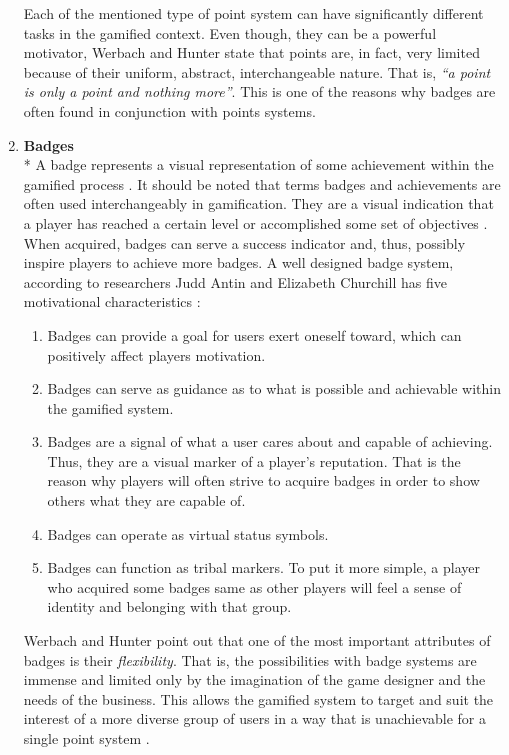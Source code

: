 \begin{enumerate}
\begin{itemize}
\end{itemize}
Each of the mentioned type of point system can have significantly different tasks in the gamified context. Even though, they can be a powerful motivator, Werbach and Hunter state that points are, in fact, very limited because of their uniform, abstract, interchangeable nature. That is, \textit{``a point is only a point and nothing more''}\cite{werbach2012win}. This is one of the reasons why badges are often found in conjunction with points systems.
\item \textbf{Badges}\\*
A badge represents a visual representation of some achievement within the gamified process \cite{WerbachCoursera, werbach2012win}. It should be noted that terms badges and achievements are often used interchangeably in
gamification. They are a visual indication that a player has reached a certain level or accomplished some set of objectives \cite{werbach2012win, zichermann2011gamification}. When acquired, badges can serve a success indicator and, thus, possibly inspire players to achieve more badges. A well designed badge system, according to researchers Judd Antin and Elizabeth Churchill has five motivational characteristics \cite{werbach2012win}:
\begin{enumerate}
\item Badges can provide a goal for users exert oneself toward, which can positively affect players motivation.
\item Badges can serve as guidance as to what is possible and achievable within the gamified system. 
\item Badges are a signal of what a user cares about and capable of achieving. Thus, they are a visual marker of a player's reputation. That is the reason why players will often strive to acquire badges in order to show others what they are capable of.
\item Badges can operate as virtual status symbols. 
\item Badges can function as tribal markers. To put it more simple, a player who acquired some badges same as other players will feel a sense of identity and belonging with that group.
\end{enumerate}
Werbach and Hunter point out that one of the most important attributes of badges is their \textit{flexibility}. That is, the possibilities with badge systems are immense and limited only by the imagination of the game designer and the needs of the business. This allows the gamified system to target and suit the interest of a more diverse group of users in a way that is unachievable for a single point system \cite{werbach2012win}. 

\end{enumerate}
